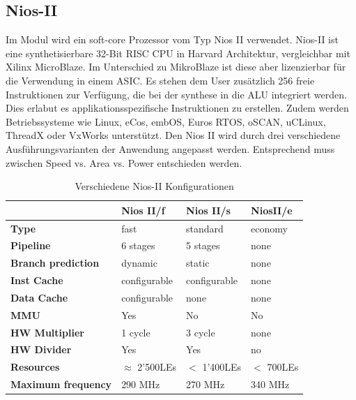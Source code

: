 \documentclass[11pt,a4paper,oneside]{scrartcl}
\begin{document}
\subsection{Nios-II}
Im Modul wird ein soft-core Prozessor vom Typ Nios II verwendet. Nios-II ist eine synthetisierbare 32-Bit RISC CPU in Harvard Architektur, vergleichbar mit Xilinx MicroBlaze. Im Unterschied zu MikroBlaze ist diese aber lizenzierbar für die Verwendung in einem ASIC. Es stehen dem User zusätzlich 256 freie Instruktionen zur Verfügung, die bei der synthese in die ALU integriert werden. Dies erlabut es applikationsspezifische Instruktionen zu erstellen. Zudem werden Betriebssysteme wie Linux, eCos, embOS, Euros RTOS, oSCAN, uCLinux, ThreadX oder VxWorks unterstützt. Den Nios II wird durch drei verschiedene Ausführungsvarianten der Anwendung angepasst werden. Entsprechend muss zwischen Speed vs. Area vs. Power entschieden werden.
\begin{table}[h!]
\begin{center}
\begin{tabular}{l|l|l|l}
 & Nios II/f & Nios II/s & NiosII/e \\
 \hline
 \textbf{Type} & fast & standard & economy \\
 \textbf{Pipeline} & 6 stages & 5 stages & none\\
 \textbf{Branch prediction} & dynamic & static &none\\
 \textbf{Inst Cache} & configurable & configurable & none\\
 \textbf{Data Cache} & configurable & none & none\\
 \textbf{MMU} & Yes & No & No\\
 \textbf{HW Multiplier} &1 cycle & 3 cycle & none\\
 \textbf{HW Divider} & Yes & Yes & no\\
 \textbf{Resources} & $\approx$ 2'500LEs & $<$ 1'400LEs & $<$ 700LEs \\
 \textbf{Maximum frequency} & 290 MHz & 270 MHz & 340 MHz\\
\end{tabular}
\caption{Verschiedene Nios-II Konfigurationen}
\end{center}
\end{table}
\end{document}
